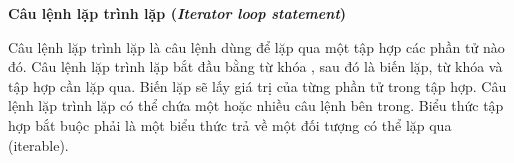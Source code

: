 \noindent\textbf{\label{ch2:for_stmt}Câu lệnh lặp trình lặp (\textit{Iterator loop statement})}

\regexiterloopstmt

Câu lệnh lặp trình lặp là câu lệnh dùng để lặp qua một tập hợp các phần tử nào đó. Câu lệnh lặp trình lặp bắt đầu bằng từ khóa , sau đó là biến lặp, từ khóa  và tập hợp cần lặp qua. Biến lặp sẽ lấy giá trị của từng phần tử trong tập hợp. Câu lệnh lặp trình lặp có thể chứa một hoặc nhiều câu lệnh bên trong. Biểu thức tập hợp bắt buộc phải là một biểu thức trả về một đối tượng có thể lặp qua (iterable).
